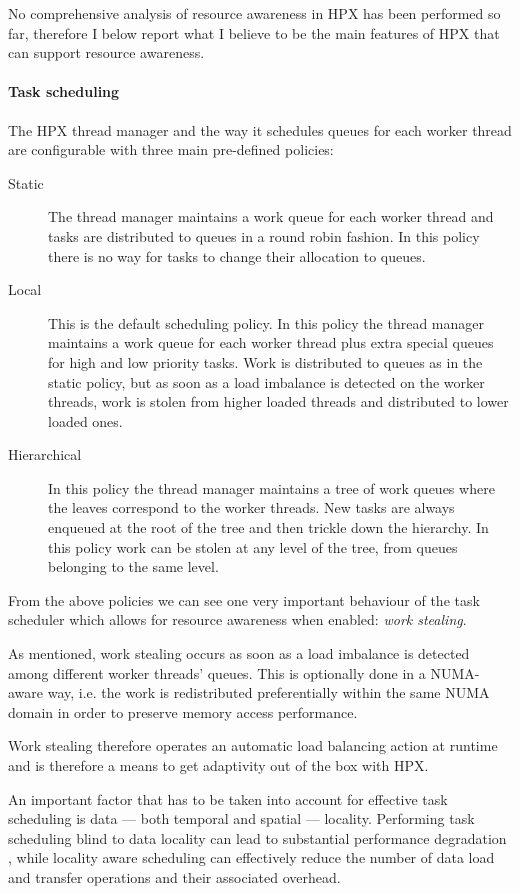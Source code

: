No comprehensive analysis of resource awareness in HPX has been performed so far, therefore I below report what I believe to be the main features of HPX that can support resource awareness.
\\ 

\paragraph{Task scheduling}
The HPX thread manager and the way it schedules queues for each worker thread are configurable with three main pre-defined policies\cite{heller2017hpx,amatya2014parallel}:
\begin{description}
	\item [Static] The thread manager maintains a work queue for each worker thread and tasks are distributed to queues in a round robin fashion. In this policy there is no way for tasks to change their allocation to queues.
	\item [Local] This is the default scheduling policy. In this policy the thread manager maintains a work queue for each worker thread plus extra special queues for high and low priority tasks. Work is distributed to queues as in the static policy, but as soon as a load imbalance is detected on the worker threads, work is stolen from higher loaded threads and distributed to lower loaded ones.
	\item [Hierarchical] In this policy the thread manager maintains a tree of work queues where the leaves correspond to the worker threads. New tasks are always enqueued at the root of the tree and then trickle down the hierarchy. In this policy work can be stolen at any level of the tree, from queues belonging to the same level.
\end{description}

From the above policies we can see one very important behaviour of the task scheduler which allows for resource awareness when enabled: \emph{work stealing}.

As mentioned, work stealing occurs as soon as a load imbalance is detected among different worker threads' queues.
This is optionally done in a NUMA-aware way, i.e. the work is redistributed preferentially within the same NUMA domain in order to preserve memory access performance.

Work stealing therefore operates an automatic load balancing action at runtime and is therefore a means to get adaptivity out of the box with HPX.

An important factor that has to be taken into account for effective task scheduling is data --- both temporal and spatial --- locality. Performing task scheduling blind to data locality can lead to substantial performance degradation \cite{connelly1994workload}, while locality aware scheduling can effectively reduce the number of data load and transfer operations and their associated overhead.


